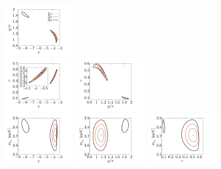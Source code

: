 \documentclass[aps,prd,nofootinbib,preprint]{revtex4}
\begin{document}
\begin{figure}[!h]
 \flushleft
\hspace{15mm}\includegraphics[width=0.32\textwidth]{figs/x_eta.pdf}$~~~~~~$\\
\hspace{15mm} \includegraphics[width=0.32\textwidth]{figs/x_r.pdf}\hspace{-11mm}
 \includegraphics[width=0.32\textwidth]{figs/eta_r.pdf}$~~~~~~$\\
\hspace{15mm} \includegraphics[width=0.32\textwidth]{figs/x_ma.pdf}\hspace{-11mm}
 \includegraphics[width=0.32\textwidth]{figs/eta_ma.pdf}\hspace{-11mm}
 \includegraphics[width=0.32\textwidth]{figs/r_ma.pdf}

\end{figure}
\end{document}

